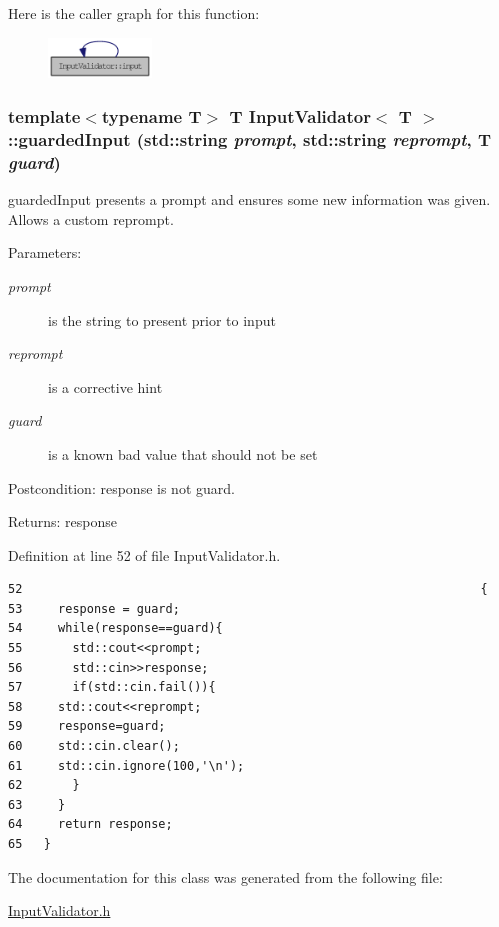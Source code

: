 Here is the caller graph for this function:\nopagebreak
\begin{figure}[H]
\begin{center}
\leavevmode
\includegraphics[width=78pt]{classInputValidator_4d554feb8dc41f8990e62a34d2678574_icgraph}
\end{center}
\end{figure}
\hypertarget{classInputValidator_c00d4a6ca94d48eb3c8b9e2b57b31950}{
\subsubsection[guardedInput]{\setlength{\rightskip}{0pt plus 5cm}template$<$typename T$>$ T {\bf InputValidator}$<$ T $>$::guardedInput (std::string {\em prompt}, \/  std::string {\em reprompt}, \/  T {\em guard})}}
\label{classInputValidator_c00d4a6ca94d48eb3c8b9e2b57b31950}


guardedInput presents a prompt and ensures some new information was given. Allows a custom reprompt.

\begin{Desc}
\item[Parameters:]
\begin{description}
\item[{\em prompt}]is the string to present prior to input \item[{\em reprompt}]is a corrective hint \item[{\em guard}]is a known bad value that should not be set \end{description}
\end{Desc}
\begin{Desc}
\item[Postcondition:]response is not guard. \end{Desc}
\begin{Desc}
\item[Returns:]response \end{Desc}


Definition at line 52 of file InputValidator.h.

\begin{Code}\begin{verbatim}52                                                                {
53     response = guard;
54     while(response==guard){
55       std::cout<<prompt;
56       std::cin>>response;
57       if(std::cin.fail()){
58     std::cout<<reprompt;
59     response=guard;
60     std::cin.clear();
61     std::cin.ignore(100,'\n');
62       }
63     }
64     return response;
65   }
\end{verbatim}
\end{Code}




The documentation for this class was generated from the following file:\begin{CompactItemize}
\item 
\hyperlink{InputValidator_8h}{InputValidator.h}\end{CompactItemize}
